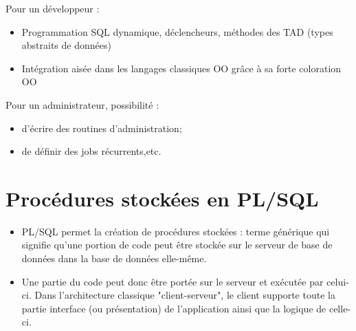 \documentclass[10pt]{beamer}
\begin{document}
\begin{frame}{\secname}
    Pour un développeur :
    \begin{itemize}
        \item Programmation SQL dynamique, déclencheurs, méthodes des TAD (types abstraits de données)
        \item Intégration aisée dans les langages classiques OO grâce à sa forte coloration OO
    \end{itemize}
\end{frame}

\begin{frame}{\secname}
    Pour un administrateur, possibilité :
    \begin{itemize}
        \item d'écrire des routines d'administration;
        \item de définir des jobs récurrents,etc.
    \end{itemize}
\end{frame}

\section{Procédures stockées en PL/SQL}
\begin{frame}{\secname}
    \begin{itemize}
        \item PL/SQL permet la création de procédures stockées : terme générique qui signifie qu'une portion de code peut être stockée sur le serveur de base de données dans la base de données elle-même.
        \item Une partie du code peut donc être portée sur le serveur et exécutée par celui-ci. Dans l'architecture classique "client-serveur", le client supporte toute la partie interface (ou présentation) de l'application ainsi que la logique de celle-ci.
    \end{itemize}
\end{frame}
\end{document}
